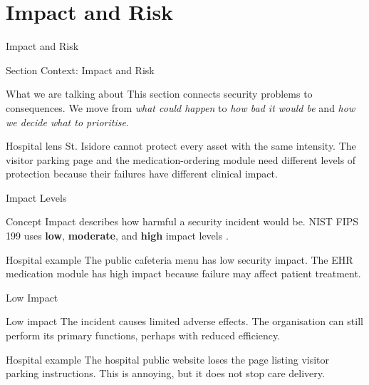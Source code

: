 \documentclass[presentation]{beamer}
\newcommand{\sectiontitleframe}[1]{
\begin{frame}[plain,c]
\begin{center}
{\usebeamerfont{title}\usebeamercolor[fg]{title}#1}
\end{center}
\end{frame}
}
\begin{document}
\section{Impact and Risk}
\sectiontitleframe{Impact and Risk}

\begin{frame}[c]{Section Context: Impact and Risk}
\begin{block}{What we are talking about}
This section connects security problems to consequences. We move from \textit{what could happen}
to \textit{how bad it would be} and \textit{how we decide what to prioritise}.
\end{block}

\begin{exampleblock}{Hospital lens}
St. Isidore cannot protect every asset with the same intensity. The visitor parking page and the
medication-ordering module need different levels of protection because their failures have
different clinical impact.
\end{exampleblock}
\end{frame}

\begin{frame}[c]{Impact Levels}
\begin{block}{Concept}
Impact describes how harmful a security incident would be. NIST FIPS 199 uses
\textbf{low}, \textbf{moderate}, and \textbf{high} impact levels \cite{nist_fips_199}.
\end{block}

\begin{exampleblock}{Hospital example}
The public cafeteria menu has low security impact. The EHR medication module has high impact
because failure may affect patient treatment.
\end{exampleblock}
\end{frame}

\begin{frame}[c]{Low Impact}
\begin{block}{Low impact}
The incident causes limited adverse effects. The organisation can still perform its primary
functions, perhaps with reduced efficiency.
\end{block}

\begin{exampleblock}{Hospital example}
The hospital public website loses the page listing visitor parking instructions. This is annoying,
but it does not stop care delivery.
\end{exampleblock}
\end{frame}
\end{document}
